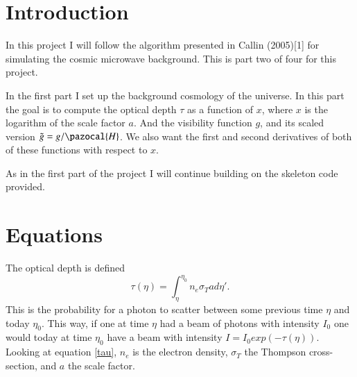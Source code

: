 \documentclass{aa}   %
\begin{document}
  



\section{Introduction}\label{sec:introduction}
In this project I will follow the algorithm presented in Callin (2005)[1] for simulating the cosmic microwave background.  
This is part two of four for this project.

In the first part I set up the background cosmology of the universe. 
In this part the goal is to compute the optical depth $\tau$ as a function of $x$, where $x$ is the logarithm of the scale factor $a$. And the visibility function $g$, and its scaled version $\tilde{g} = g/\pazocal{H}$. We also want the first and second derivatives of both of these functions with respect to $x$.

As in the first part of the project I will continue building on the skeleton code provided.

\section{Equations}\label{sec:Equations}
The optical depth is defined
\begin{equation}\label{tau}
 \tau(\eta) = \int_\eta^{\eta_0}n_e\sigma_T ad\eta'.
\end{equation}
This is the probability for a photon to scatter between some previous time $\eta$ and today $\eta_0$. This way, if one at time $\eta$ had a beam of photons with intensity $I_0$ one would today at time $\eta_0$ have a beam with intensity $I = I_0exp(-\tau(\eta))$.
Looking at equation \ref{tau}, $n_e$ is the electron density, $\sigma_T$ the Thompson cross-section, and $a$ the scale factor.
\end{document}
